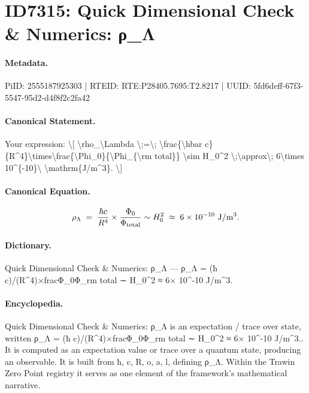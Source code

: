 \section*{ID7315: Quick Dimensional Check \& Numerics: ρ\_Λ}
\paragraph{Metadata.}
PiID: 2555187925303 | RTEID: RTE:P28405.7695:T2.8217 | UUID: 5fd6deff-67f3-5547-95d2-d4f8f2c2fa42

\paragraph{Canonical Statement.}
Your expression: \textbackslash{}[ \textbackslash{}rho\_\textbackslash{}Lambda \textbackslash{};=\textbackslash{}; \textbackslash{}frac\{\textbackslash{}hbar c\}\{R\textasciicircum{}4\}\textbackslash{}times\textbackslash{}frac\{\textbackslash{}Phi\_0\}\{\textbackslash{}Phi\_\{\textbackslash{}rm total\}\} \textbackslash{}sim H\_0\textasciicircum{}2 \textbackslash{};\textbackslash{}approx\textbackslash{}; 6\textbackslash{}times 10\textasciicircum{}\{-10\}\textbackslash{} \textbackslash{}mathrm\{J/m\textasciicircum{}3\}. \textbackslash{}]

\paragraph{Canonical Equation.}
\[
\rho_\Lambda \;=\; \frac{\hbar c}{R^4}\times\frac{\Phi_0}{\Phi_{\rm total}} \sim H_0^2 \;\approx\; 6\times 10^{-10}\ \mathrm{J/m^3}.
\]

\paragraph{Dictionary.}
Quick Dimensional Check \& Numerics: ρ\_Λ — ρ\_Λ = (ħ c)/(R\textasciicircum{}4)×fracΦ\_0Φ\_rm total ∼ H\_0\textasciicircum{}2 ≈ 6× 10\textasciicircum{}-10 J/m\textasciicircum{}3.

\paragraph{Encyclopedia.}
Quick Dimensional Check \& Numerics: ρ\_Λ is an expectation / trace over state, written ρ\_Λ = (ħ c)/(R\textasciicircum{}4)×fracΦ\_0Φ\_rm total ∼ H\_0\textasciicircum{}2 ≈ 6× 10\textasciicircum{}-10 J/m\textasciicircum{}3.. It is computed as an expectation value or trace over a quantum state, producing an observable. It is built from ħ, c, R, o, a, l, defining ρ\_Λ. Within the Trawin Zero Point registry it serves as one element of the framework's mathematical narrative.
